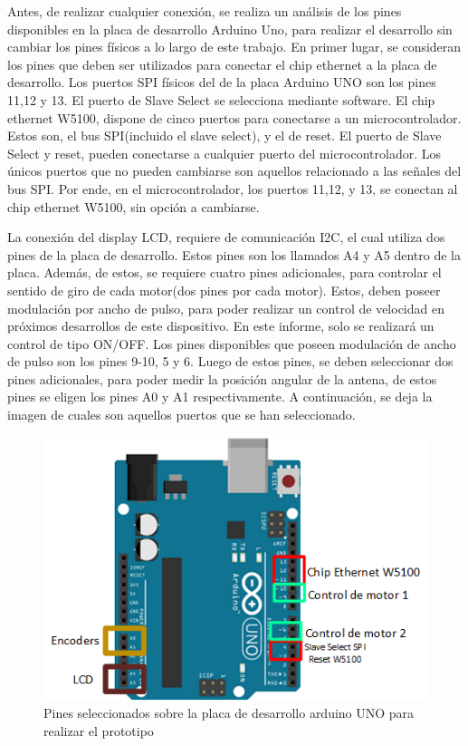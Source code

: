 Antes, de realizar cualquier conexión, se realiza un análisis de los pines disponibles en la placa de desarrollo Arduino Uno, para realizar el desarrollo sin cambiar los pines físicos a lo largo de este trabajo. En primer lugar, se consideran los pines que deben ser utilizados para conectar el chip ethernet a la placa de desarrollo. Los puertos SPI físicos del de la placa Arduino UNO son los pines 11,12 y 13. El puerto de Slave Select se selecciona mediante software. El chip ethernet W5100, dispone de cinco puertos para conectarse a un microcontrolador. Estos son, el bus SPI(incluido el slave select), y el de reset. El puerto de Slave Select y reset, pueden conectarse a cualquier puerto del microcontrolador. Los únicos puertos que no pueden cambiarse son aquellos relacionado a las señales del bus SPI. Por ende, en el microcontrolador, los puertos 11,12, y 13, se conectan al chip ethernet W5100, sin opción a cambiarse.    

La conexión del display LCD, requiere de comunicación I2C, el cual utiliza dos pines de la placa de desarrollo. Estos pines son los llamados A4 y A5 dentro de la placa. Además, de estos, se requiere cuatro pines adicionales, para controlar el sentido de giro de cada motor(dos pines por cada motor). Estos, deben poseer modulación por ancho de pulso, para poder realizar un control de velocidad en próximos desarrollos de este dispositivo. En este informe, solo se realizará un control de tipo ON/OFF. Los pines disponibles que poseen modulación de ancho de pulso son los pines 9-10, 5 y 6. Luego de estos pines, se deben seleccionar dos pines adicionales, para poder medir la posición angular de la antena, de estos pines se eligen los pines A0 y A1 respectivamente. A continuación, se deja la imagen de cuales son aquellos puertos que se han seleccionado.   

\begin{figure}[H]
	\centering
	\includegraphics{pines_ard_uno}
	\caption{Pines seleccionados sobre la placa de desarrollo arduino UNO para realizar el prototipo}
	\label{fig:pin_select_ard_uno}
\end{figure}


